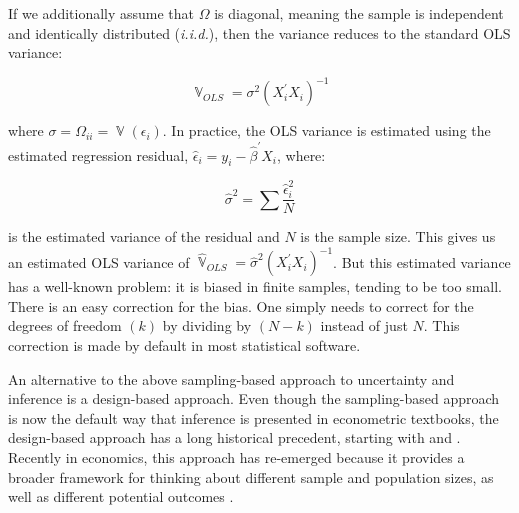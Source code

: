 \documentclass[11pt]{article}
\DeclareMathOperator{\V}{\mathbb{V}}
\begin{document}
\noindent If we additionally assume that $\Omega$ is diagonal, meaning the sample is independent and identically distributed (\emph{i.i.d.}), then the variance reduces to the standard OLS variance:

\begin{equation}
    \V_{OLS} = \sigma^2 \left( X_{i}^{'} X_{i} \right)^{-1}
\end{equation}

\noindent where $\sigma= \Omega_{ii} = \V (\epsilon_i)$. In practice, the OLS variance is estimated using the estimated regression residual, $\hat{\epsilon}_i = y_i - \hat{\beta}^{'} X_i$, where:

\begin{equation}
    \hat{\sigma}^{2} = \sum \frac{\hat{\epsilon}^{2}_{i}}{N}
\end{equation}

\noindent is the estimated variance of the residual and $N$ is the sample size. This gives us an estimated OLS variance of $\hat{\V}_{OLS} = \hat{\sigma}^{2} (X_{i}^{'} X_{i})^{-1}$. But this estimated variance has a well-known problem: it is biased in finite samples, tending to be too small. There is an easy correction for the bias. One simply needs to correct for the degrees of freedom $(k)$ by dividing by $(N-k)$ instead of just $N$. This correction is made by default in most statistical software.

An alternative to the above sampling-based approach to uncertainty and inference is a design-based approach. Even though the sampling-based approach is now the default way that inference is presented in econometric textbooks, the design-based approach has a long historical precedent, starting with \cite{neyman_application_1923} and \cite{fisher_design_1935}.  Recently in economics, this approach has re-emerged because it provides a broader framework for thinking about different sample and population sizes, as well as different potential outcomes \citep{imbens_causal_2015, abadie_when_2017, abadie_samplingbased_2020}.
\end{document}
